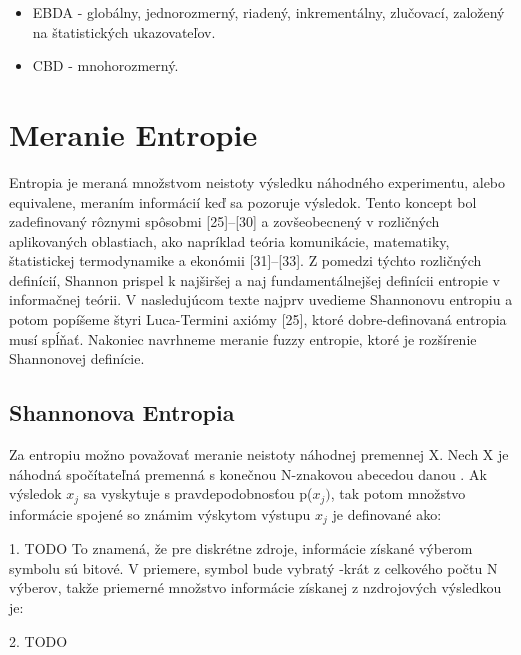 \begin{itemize}
\item
EBDA - globálny, jednorozmerný, riadený, inkrementálny, zlučovací, založený na štatistických ukazovateľov. 
\cite{Sang2010} 
\item
CBD - mnohorozmerný. 
\cite{Garcia2010} 

\end{itemize}






















\pagebreak
\section{Meranie Entropie}
Entropia je meraná množstvom neistoty výsledku náhodného experimentu, alebo equivalene, meraním informácií keď sa pozoruje výsledok. Tento koncept bol zadefinovaný rôznymi spôsobmi [25]–[30] a zovšeobecnený v rozličných aplikovaných oblastiach, ako napríklad teória komunikácie, matematiky, štatistickej termodynamike a ekonómii [31]–[33]. Z pomedzi týchto rozličných definícií, Shannon prispel k najširšej a naj fundamentálnejšej definícii entropie v informačnej teórii. V nasledujúcom texte najprv uvedieme Shannonovu entropiu a potom popíšeme štyri Luca-Termini axiómy [25], ktoré dobre-definovaná entropia musí spĺňať. Nakoniec navrhneme meranie fuzzy entropie, ktoré je rozšírenie Shannonovej definície.

\subsection{Shannonova Entropia}
Za entropiu možno považovať meranie neistoty náhodnej premennej X. Nech X je náhodná spočítateľná premenná s konečnou N-znakovou abecedou danou   .
Ak výsledok $x_j$ sa vyskytuje s pravdepodobnosťou p($x_j)$, tak potom množstvo informácie spojené so známim výskytom výstupu $x_j$ je definované ako:

1. TODO
To znamená, že pre diskrétne zdroje, informácie získané výberom symbolu sú bitové. V priemere, symbol  bude vybratý -krát z celkového počtu N výberov, takže priemerné množstvo informácie získanej z nzdrojových výsledkou je:

2. TODO 


